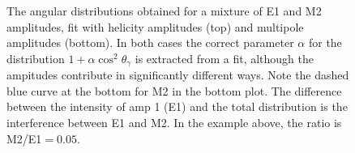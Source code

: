 \documentclass[11pt]{article}
\begin{document}
\begin{figure}
  \hfill
  \caption{
    The angular distributions obtained for a mixture of E1 and M2
    amplitudes, fit with helicity amplitudes (top) and multipole
    amplitudes (bottom). In both cases the correct parameter $\alpha$ for
    the distribution $1 + \alpha \cos^{2} \theta_{\gamma}$ is extracted
    from a fit, although the ampitudes contribute in significantly
    different ways. Note the dashed blue curve at the bottom for M2 in
    the bottom plot. The difference between the intensity of amp 1 (E1)
    and the total distribution is the interference between E1 and M2. In
    the example above, the ratio is M2/E1$=0.05$.
  }
  \label{fig:fits_multipole}
\end{figure}
\end{document}
